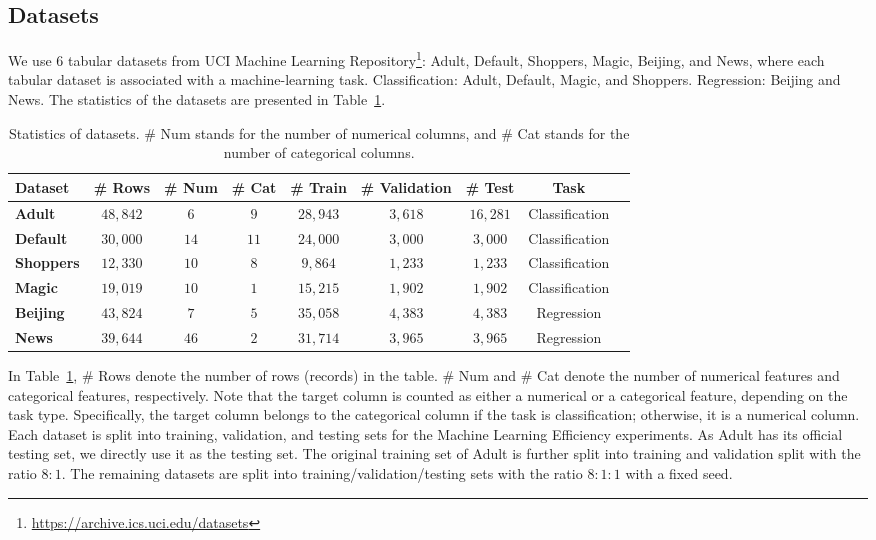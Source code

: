 \subsection{Datasets}\label{appendix:dataset}
We use $6$ tabular datasets from UCI Machine Learning Repository\footnote{\url{https://archive.ics.uci.edu/datasets}}: Adult, Default, Shoppers, Magic, Beijing, and News, where each tabular dataset is associated with a machine-learning task. Classification: Adult, Default, Magic, and Shoppers. Regression: Beijing and News. The statistics of the datasets are presented in Table~\ref{tbl:exp-dataset}.
\begin{table}[h] 
    \centering
    \caption{Statistics of datasets. \# Num stands for the number of numerical columns, and \# Cat stands for the number of categorical columns.} 
    \label{tbl:exp-dataset}
    \small
    \begin{threeparttable}
    {
    \scalebox{1.0}
    {
	\begin{tabular}{lcccccccc}
            \toprule[0.8pt]
            \textbf{Dataset} & \# Rows  & \# Num & \# Cat & \# Train & \# Validation & \# Test & Task  \\
            \midrule 
            \textbf{Adult} & $48,842$ & $6$ & $9$ & $28,943$ & $3,618$ & $16,281$ & Classification  \\
            \textbf{Default} & $30,000$ & $14$ & $11$ & $24,000$ & $3,000$ & $3,000$ & Classification   \\
            \textbf{Shoppers} & $12,330$ & $10$ & $8$ & $9,864$   & $1,233$ & $1,233$ & Classification   \\
            \textbf{Magic} & $19,019$ & $10$ & $1$ & $15,215$  & $1,902$ & $1,902$ & Classification  \\
            \textbf{Beijing} & $43,824$ & $7$ & $5$ & $35,058$  & $4,383$ & $4,383$ &  Regression   \\
            \textbf{News} & $39,644$ & $46$ & $2$ & $31,714$  & $3,965$ & $3,965$ & Regression \\
		\bottomrule[1.0pt] 
		\end{tabular}
   }
  }        
  \end{threeparttable}
\end{table}

In Table~\ref{tbl:exp-dataset}, \# Rows denote the number of rows (records) in the table. \# Num and \# Cat denote the number of numerical features and categorical features, respectively. Note that the target column is counted as either a numerical or a categorical feature, depending on the task type. Specifically, the target column belongs to the categorical column if the task is classification; otherwise, it is a numerical column. Each dataset is split into training, validation, and testing sets for the Machine Learning Efficiency experiments. As Adult has its official testing set, we directly use it as the testing set. The original training set of Adult is further split into training and validation split with the ratio $8:1$. The remaining datasets are split into training/validation/testing sets with the ratio $8:1:1$ with a fixed seed.

